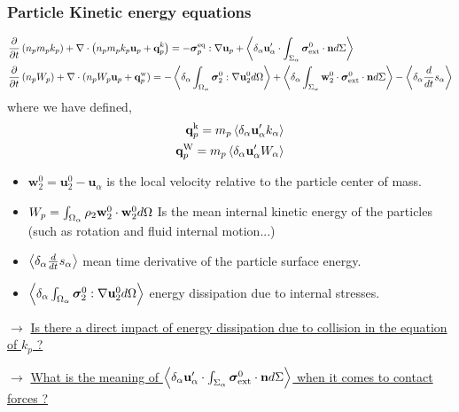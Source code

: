 \documentclass{sintefbeamer}
\begin{document}
\begin{frame}
  \frametitle{Particle Kinetic energy equations }
  \footnotesize
  \begin{align*}
    &\frac{\partial}{\partial t} \left(n_p m_p k_p\right)
    + \mathbf{\nabla}\cdot \left(n_p
    m_p k_p \textbf{u}_p 
    + \textbf{q}^k_p
    \right)
    = 
    - \bm{\sigma}_p^\text{eq}  :\mathbf{\nabla} \textbf{u}_p
    + \left<\delta_\alpha \textbf{u}_\alpha'\cdot\int_{\Sigma_\alpha} \bm{\sigma}_\text{ext}^0 \cdot \textbf{n} d\Sigma\right>\\
    &\frac{\partial}{\partial t} \left(n_p W_p\right)
    + \mathbf{\nabla}\cdot 
    (n_p W_p
    \textbf{u}_p 
    +  \textbf{q}_p^\text{w}
    )
    = 
    - \left<\delta_\alpha \int_{\Omega_\alpha} {\bm{\sigma}_2^0 : \mathbf{\nabla}\textbf{u}_2^0} d\Omega\right>
    + \left<\delta_\alpha \int_{\Sigma_\alpha} {\textbf{w}_2^0 \cdot \bm{\sigma}_\text{ext}^0 \cdot  \textbf{n}} d\Sigma\right>
    - \left<\delta_\alpha \frac{d}{d t}{ s_\alpha}\right>
\end{align*}
where we have defined, 
\begin{align*}
    \textbf{q}_p^\text{k}
    = m_p \left<\delta_\alpha \textbf{u}_\alpha' k_\alpha\right> \\
    \textbf{q}_p^\text{W}
    = m_p \left<\delta_\alpha \textbf{u}_\alpha' W_\alpha\right> 
\end{align*}

\begin{itemize}
  \item $\textbf{w}_2^0 = \textbf{u}_2^0 - \textbf{u}_\alpha$ is the local velocity relative to the particle center of mass. 
  \item $W_p = \int_{\Omega_\alpha} \rho_2\textbf{w}_2^0\cdot \textbf{w}_2^0 d\Omega$
  Is the mean internal kinetic energy of the particles (such as rotation and fluid internal motion...)
  \item $\left<\delta_\alpha \frac{d}{d t}{ s_\alpha}\right>$ mean time derivative of the particle surface energy. 
  \item $\left<\delta_\alpha \int_{\Omega_\alpha} {\bm{\sigma}_2^0 : \mathbf{\nabla}\textbf{u}_2^0} d\Omega\right>$ energy dissipation due to internal stresses. 
\end{itemize}

$\to$ \underline{Is there a direct impact of  energy dissipation due to collision in the equation  of  $k_p$ ?
}

$\to$ \underline{What is the meaning of $\left<\delta_\alpha \textbf{u}_\alpha'\cdot\int_{\Sigma_\alpha} \bm{\sigma}_\text{ext}^0 \cdot \textbf{n} d\Sigma\right>$ when it comes to contact forces  ?}
\end{frame}
\end{document}
